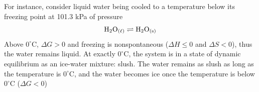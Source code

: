For instance, consider liquid water being cooled to a temperature below its freezing point at
101.3 kPa of pressure
\[
    \ch{H2O_{(\ell)}}\rightleftharpoons \ch{H2O_{(s)}}
\]
Above $0^{\circ}$C, $\Delta G>0$ and freezing is nonspontaneous ($\Delta H\leq0$ and $\Delta S<0$),
thus the water remains liquid. At exactly $0^{\circ}$C, the system is in a state of dynamic
equilibrium as an ice-water mixture: slush. The water remains as slush as long as the temperature
is $0^{\circ}$C, and the water becomes ice once the temperature is below $0^{\circ}$C ($\Delta G<0$)
